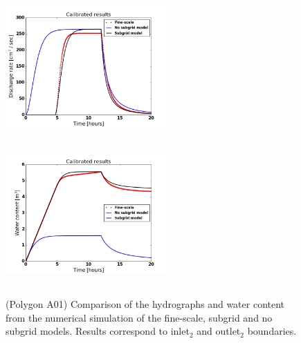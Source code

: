 \documentclass[review,11pt]{elsarticle}
\begin{document}
\begin{figure}[!h]
\centering
\includegraphics[width=6.2cm, height=5.5cm]{./figures/POLYGON_A01/POLYGON_A01dischargeCalibDDManning.png}
\includegraphics[width=6.2cm, height=5.5cm]{./figures/POLYGON_A01/POLYGON_A01watercontentCalibDDManning.png}
\caption{(Polygon A01) Comparison of the hydrographs and water content from the numerical simulation of the fine-scale, subgrid and no subgrid models. Results correspond to  inlet$_2$ and outlet$_2$ boundaries.}
\label{polygon-A01}
\end{figure}
\end{document}

